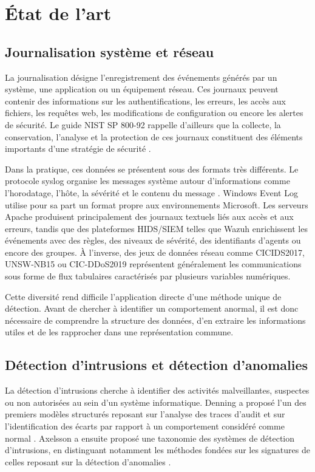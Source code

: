 \chapter{État de l'art}

\section{Journalisation système et réseau}

La journalisation désigne l'enregistrement des événements générés par un système, une application ou un équipement réseau. Ces journaux peuvent contenir des informations sur les authentifications, les erreurs, les accès aux fichiers, les requêtes web, les modifications de configuration ou encore les alertes de sécurité. Le guide NIST SP 800-92 rappelle d'ailleurs que la collecte, la conservation, l'analyse et la protection de ces journaux constituent des éléments importants d'une stratégie de sécurité \cite{nist80092}.

Dans la pratique, ces données se présentent sous des formats très différents. Le protocole syslog organise les messages système autour d'informations comme l'horodatage, l'hôte, la sévérité et le contenu du message \cite{rfc5424}. Windows Event Log utilise pour sa part un format propre aux environnements Microsoft. Les serveurs Apache produisent principalement des journaux textuels liés aux accès et aux erreurs, tandis que des plateformes HIDS/SIEM telles que Wazuh enrichissent les événements avec des règles, des niveaux de sévérité, des identifiants d'agents ou encore des groupes. À l'inverse, des jeux de données réseau comme CICIDS2017, UNSW-NB15 ou CIC-DDoS2019 représentent généralement les communications sous forme de flux tabulaires caractérisés par plusieurs variables numériques.

Cette diversité rend difficile l'application directe d'une méthode unique de détection. Avant de chercher à identifier un comportement anormal, il est donc nécessaire de comprendre la structure des données, d'en extraire les informations utiles et de les rapprocher dans une représentation commune.

\section{Détection d'intrusions et détection d'anomalies}

La détection d'intrusions cherche à identifier des activités malveillantes, suspectes ou non autorisées au sein d'un système informatique. Denning a proposé l'un des premiers modèles structurés reposant sur l'analyse des traces d'audit et sur l'identification des écarts par rapport à un comportement considéré comme normal \cite{denning1987intrusion}. Axelsson a ensuite proposé une taxonomie des systèmes de détection d'intrusions, en distinguant notamment les méthodes fondées sur les signatures de celles reposant sur la détection d'anomalies \cite{axelsson2000intrusion}.

